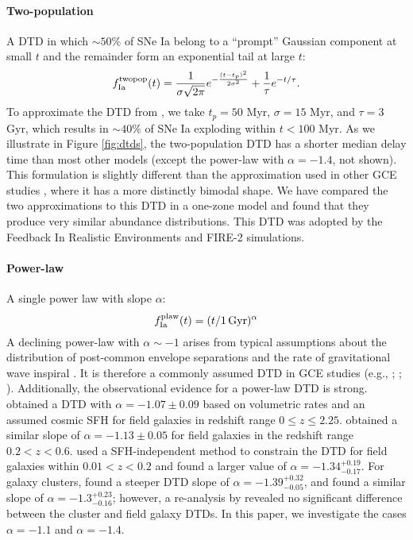 \documentclass[twocolumn,twocolappendix]{aastex631}
\begin{document}
\paragraph{Two-population} A DTD in which $\sim50\%$ of SNe Ia belong to a ``prompt'' Gaussian component at small $t$ and the remainder form an exponential tail at large $t$:
\begin{equation}
    f_{\rm Ia}^{\rm twopop}(t) = \frac{1}{\sigma\sqrt{2\pi}} e^{-\frac{(t-t_p)^2}{2\sigma^2}} + \frac{1}{\tau} e^{-t/\tau}.
    \label{eq:prompt-dtd}
\end{equation}
To approximate the DTD from \citet{Mannucci2006-TwoPopulations}, we take $t_p=50$ Myr, $\sigma=15$ Myr, and $\tau=3$ Gyr, which results in $\sim 40\%$ of SNe Ia exploding within $t<100$ Myr. As we illustrate in Figure \ref{fig:dtds}, the two-population DTD has a shorter median delay time than most other models (except the power-law with $\alpha=-1.4$, not shown). This formulation is slightly different than the approximation used in other GCE studies \citep[e.g.,][]{Matteucci2006-BimodalDTDConsequences,Poulhazan2018-PrecisionPollution}, where it has a more distinctly bimodal shape. We have compared the two approximations to this DTD in a one-zone model and found that they produce very similar abundance distributions. This DTD was adopted by the Feedback In Realistic Environments \citep[FIRE;][]{Hopkins2014-FIRE-1} and FIRE-2 \citep{Hopkins2018-FIRE-2} simulations.

\paragraph{Power-law} A single power law with slope $\alpha$:
\begin{equation}
    f_{\rm Ia}^{\rm plaw}(t) = (t/1\,\rm{Gyr})^\alpha
    \label{eq:powerlaw-dtd}
\end{equation}
A declining power-law with $\alpha\sim-1$ \citep{Totani2008-DTD} arises from typical assumptions about the distribution of post-common envelope separations and the rate of gravitational wave inspiral \citep[see Section 3.5 from][]{Maoz2014-Review}. It is therefore a commonly assumed DTD in GCE studies (e.g., \citealt{Rybizki2017-Chempy}; ; \citealt{Weinberg2023-CCSNYield}). Additionally, the observational evidence for a power-law DTD is strong. \citet{Maoz2017-CosmicDTD} obtained a DTD with $\alpha=-1.07\pm0.09$ based on volumetric rates and an assumed cosmic SFH for field galaxies in redshift range $0\leq z\leq 2.25$. \citet{Wiseman2021-DESRates} obtained a similar slope of $\alpha=-1.13\pm0.05$ for field galaxies in the redshift range $0.2<z<0.6$. \citet{Heringer2019-FieldGalaxyDTD} used a SFH-independent method to constrain the DTD for field galaxies within $0.01<z<0.2$ and found a larger value of $\alpha=-1.34^{+0.19}_{-0.17}$. For galaxy clusters, \citet{Maoz2017-CosmicDTD} found a steeper DTD slope of $\alpha=-1.39^{+0.32}_{-0.05}$, and \citet{FriedmannMaoz2018-ClusterDTD} found a similar slope of $\alpha=-1.3^{+0.23}_{-0.16}$; however, a re-analysis by \citet{FreundlichMaoz2021-ClusterDTD} revealed no significant difference between the cluster and field galaxy DTDs. In this paper, we investigate the cases $\alpha=-1.1$ and $\alpha=-1.4$.
\end{document}

